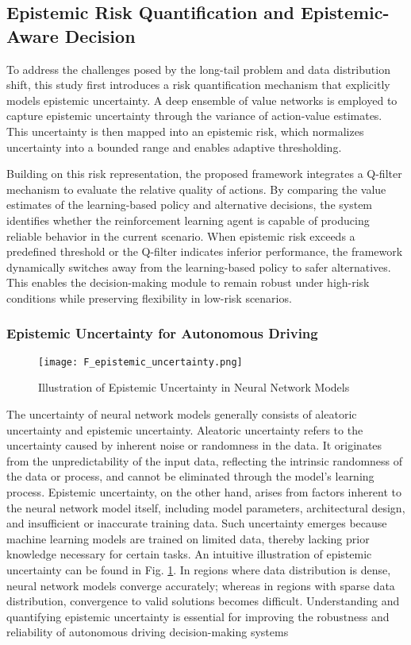 \documentclass[preprint,12pt,authoryear]{elsarticle}
\begin{document}
\subsection{Epistemic Risk Quantification and Epistemic-Aware Decision}

To address the challenges posed by the long-tail problem and data distribution shift, this study first introduces a risk quantification mechanism that explicitly models epistemic uncertainty. A deep ensemble of value networks is employed to capture epistemic uncertainty through the variance of action-value estimates. This uncertainty is then mapped into an epistemic risk, which normalizes uncertainty into a bounded range and enables adaptive thresholding.

Building on this risk representation, the proposed framework integrates a Q-filter mechanism to evaluate the relative quality of actions. By comparing the value estimates of the learning-based policy and alternative decisions, the system identifies whether the reinforcement learning agent is capable of producing reliable behavior in the current scenario. When epistemic risk exceeds a predefined threshold or the Q-filter indicates inferior performance, the framework dynamically switches away from the learning-based policy to safer alternatives. This enables the decision-making module to remain robust under high-risk conditions while preserving flexibility in low-risk scenarios.

\subsubsection{Epistemic Uncertainty for Autonomous Driving}

\begin{figure}[hbtp]
\centering
\texttt{[image: F\_epistemic\_uncertainty.png]}
\caption{Illustration of Epistemic Uncertainty in Neural Network Models}
\label{F_epistemic_uncertainty}
\end{figure}

The uncertainty of neural network models generally consists of aleatoric uncertainty and epistemic uncertainty. Aleatoric uncertainty refers to the uncertainty caused by inherent noise or randomness in the data. It originates from the unpredictability of the input data, reflecting the intrinsic randomness of the data or process, and cannot be eliminated through the model’s learning process. Epistemic uncertainty, on the other hand, arises from factors inherent to the neural network model itself, including model parameters, architectural design, and insufficient or inaccurate training data. Such uncertainty emerges because machine learning models are trained on limited data, thereby lacking prior knowledge necessary for certain tasks. An intuitive illustration of epistemic uncertainty can be found in Fig. \ref{F_epistemic_uncertainty}. In regions where data distribution is dense, neural network models converge accurately; whereas in regions with sparse data distribution, convergence to valid solutions becomes difficult. Understanding and quantifying epistemic uncertainty is essential for improving the robustness and reliability of autonomous driving decision-making systems
\end{document}
